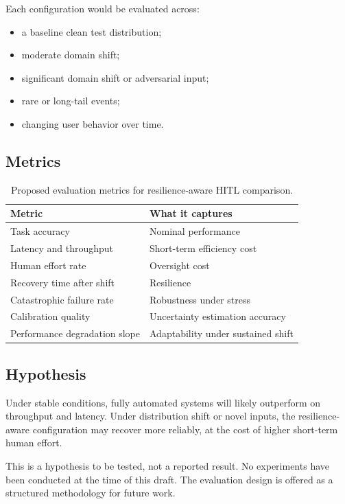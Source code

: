 \documentclass[11pt,a4paper]{article}
\theoremstyle{definition}
\theoremstyle{plain}
\theoremstyle{remark}
\begin{document}
Each configuration would be evaluated across:
\begin{itemize}
  \item a baseline clean test distribution;
  \item moderate domain shift;
  \item significant domain shift or adversarial input;
  \item rare or long-tail events;
  \item changing user behavior over time.
\end{itemize}

\subsection{Metrics}

\begin{table}[h]
\centering
\begin{tabularx}{\linewidth}{lX}
\toprule
\textbf{Metric} & \textbf{What it captures} \\
\midrule
Task accuracy & Nominal performance \\
Latency and throughput & Short-term efficiency cost \\
Human effort rate & Oversight cost \\
Recovery time after shift & Resilience \\
Catastrophic failure rate & Robustness under stress \\
Calibration quality & Uncertainty estimation accuracy \\
Performance degradation slope & Adaptability under sustained shift \\
\bottomrule
\end{tabularx}
\caption{Proposed evaluation metrics for resilience-aware HITL comparison.}
\end{table}

\subsection{Hypothesis}

Under stable conditions, fully automated systems will likely outperform on throughput and latency. Under distribution shift or novel inputs, the resilience-aware configuration may recover more reliably, at the cost of higher short-term human effort.

\begin{cautionbox}
This is a hypothesis to be tested, not a reported result. No experiments have been conducted at the time of this draft. The evaluation design is offered as a structured methodology for future work.
\end{cautionbox}
\end{document}
